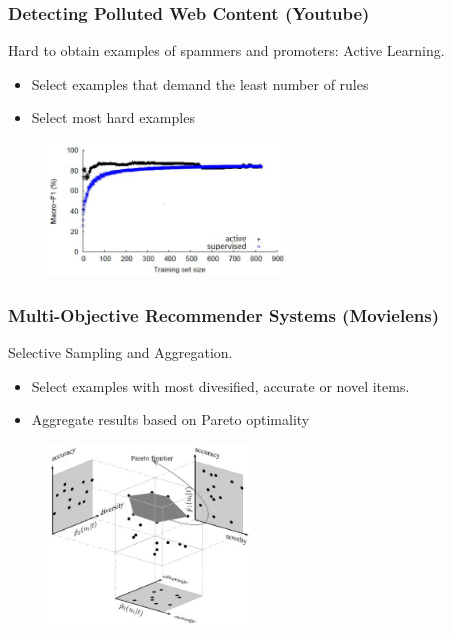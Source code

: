 \documentclass{beamer}
\begin{document}
\begin{frame}\frametitle{Detecting Polluted Web Content (Youtube)}

Hard to obtain examples of spammers and promoters: Active Learning.

\begin{itemize}
\item Select examples that demand the least number of rules
\item Select most hard examples
\end{itemize}

\begin{figure}
\centering
\includegraphics[height=1.40in]{active.eps}
\end{figure}


\end{frame}

\begin{frame}\frametitle{Multi-Objective Recommender Systems (Movielens)}

Selective Sampling and Aggregation.

\begin{itemize}
\item Select examples with most divesified, accurate or novel items.
\item Aggregate results based on Pareto optimality
\end{itemize}


\begin{figure}
\centering
\includegraphics[height=1.90in]{front.eps}
\end{figure}

\end{frame}
\end{document}
